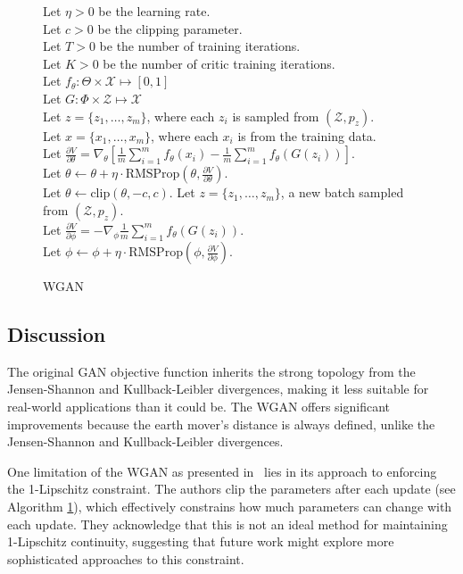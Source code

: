 \begin{figure}[H]
	\centering
	\begin{minipage}{\linewidth}
		\begin{algorithm}[H]
			Let $\eta > 0$ be the learning rate. \\
			Let $c > 0$ be the clipping parameter. \\
			Let $T > 0$ be the number of training iterations. \\
			Let $K > 0$ be the number of critic training iterations. \\
			Let $f_\theta: \Theta \times \mathcal{X} \mapsto [0, 1]$ \\
			Let $G: \Phi \times \mathcal{Z} \mapsto \mathcal{X}$ \\
			 {
				 {
					Let $z = \{z_1, \dots, z_m\}$, where each $z_i$ is sampled from $(\mathcal{Z}, p_z)$. \\
					Let $x = \{x_1, \dots, x_m\}$, where each $x_i$ is from the training data. \\
					Let $\frac{\partial V}{\partial \theta} = \nabla_\theta\left[ \frac{1}{m} \sum_{i=1}^m f_{\theta}(x_i) - \frac{1}{m} \sum_{i=1}^m f_{\theta}(G(z_i))\right]$. \\
					Let $\theta \gets \theta + \eta \cdot \text{RMSProp}(\theta, \frac{\partial V}{\partial \theta})$. \\
					Let $\theta \gets \text{clip}(\theta, -c, c)$.
				}
				Let $z = \{z_1, \dots, z_m\}$, a new batch sampled from $(\mathcal{Z}, p_z)$. \\
				Let $\frac{\partial V}{\partial \phi} = - \nabla_\phi \frac{1}{m} \sum_{i=1}^m f_{\theta}(G(z_i))$. \\
				Let $\phi \gets \phi + \eta \cdot \text{RMSProp}(\phi, \frac{\partial V}{\partial \phi})$. \\
			}
			\caption{WGAN}
			\label{algo:wgawgann-algo}
		\end{algorithm}
	\end{minipage}
\end{figure}

\subsection{Discussion}

The original GAN objective function inherits the strong topology from the Jensen-Shannon and Kullback-Leibler divergences, making it less suitable for real-world applications than it could be. The WGAN offers significant improvements because the earth mover's distance is always defined, unlike the Jensen-Shannon and Kullback-Leibler divergences.

One limitation of the WGAN as presented in~\cite{ref:arjovsky-2017} lies in its approach to enforcing the 1-Lipschitz constraint. The authors clip the parameters after each update (see Algorithm \ref{algo:wgawgann-algo}), which effectively constrains how much parameters can change with each update. They acknowledge that this is not an ideal method for maintaining 1-Lipschitz continuity, suggesting that future work might explore more sophisticated approaches to this constraint.

